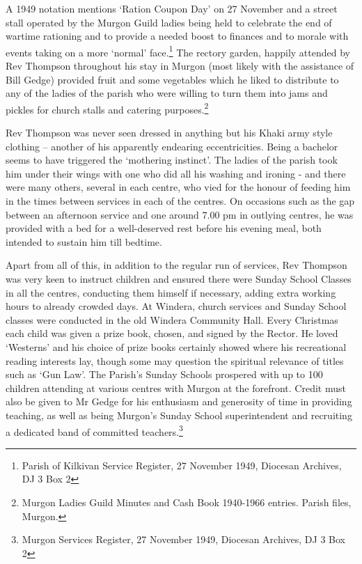 A 1949 notation mentions `Ration Coupon Day' on 27 November and a street stall operated by the Murgon Guild ladies being held to celebrate the end of wartime rationing and to provide a needed boost to finances and to morale with events taking on a more `normal' face.\footnote{Parish of Kilkivan Service Register, 27 November 1949, Diocesan Archives, DJ 3 Box 2} The rectory garden, happily attended by Rev Thompson throughout his stay in Murgon (most likely with the assistance of Bill Gedge) provided fruit and some vegetables which he liked to distribute to any of the ladies of the parish who were willing to turn them into jams and pickles for church stalls and catering purposes.\footnote{Murgon Ladies Guild Minutes and Cash Book 1940-1966 entries. Parish files, Murgon.}


Rev Thompson was never seen dressed in anything but his Khaki army style clothing -- another of his apparently endearing eccentricities. Being a bachelor seems to have triggered the `mothering instinct'. The ladies of the parish took him under their wings with one who did all his washing and ironing - and there were many others, several in each centre, who vied for the honour of feeding him in the times between services in each of the centres. On occasions such as the gap between an afternoon service and one around 7.00 pm in outlying centres, he was provided with a bed for a well-deserved rest before his evening meal, both intended to sustain him till bedtime.



Apart from all of this, in addition to the regular run of services, Rev Thompson was very keen to instruct children and ensured there were Sunday School Classes in all the centres, conducting them himself if necessary, adding extra working hours to already crowded days. At Windera, church services and Sunday School classes were conducted in the old Windera Community Hall. Every Christmas each child was given a prize book, chosen, and signed by the Rector. He loved `Westerns' and his choice of prize books certainly showed where his recreational reading interests lay, though some may question the spiritual relevance of titles such as `Gun Law'. The Parish's Sunday Schools prospered with up to 100 children attending at various centres with Murgon at the forefront. Credit must also be given to Mr Gedge for his enthusiasm and generosity of time in providing teaching, as well as being Murgon's Sunday School superintendent and recruiting a dedicated band of committed teachers.\footnote{Murgon Services Register, 27 November 1949, Diocesan Archives, DJ 3 Box 2}


